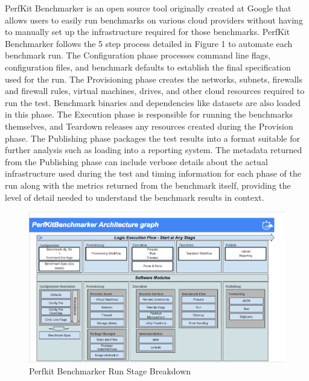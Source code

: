 

PerfKit Benchmarker is an open source tool originally created at Google that allows users to easily run benchmarks on various cloud providers without having to manually set up the infrastructure required for those benchmarks. PerfKit Benchmarker follows the 5 step process detailed in Figure 1 to automate each benchmark run. The Configuration phase processes command line flags, configuration files, and benchmark defaults to establish the final specification used for the run. The Provisioning phase creates the networks, subnets, firewalls and firewall rules, virtual machines, drives, and other cloud resources required to run the test. Benchmark binaries and dependencies like datasets are also loaded in this phase. The Execution phase is responsible for running the benchmarks themselves,  and Teardown releases any resources created during the Provision phase. The Publishing phase packages the test results into a format suitable for further analysis such as  loading into a reporting system. The metadata returned from the Publishing phase can include verbose details about the actual infrastructure used during the test and timing information for each phase of the run along with the metrics returned from the benchmark itself, providing the level of detail needed to understand the benchmark results in context.


\begin{figure}[ht]
\centering
\includegraphics[width=.75\textwidth]{resource/img/ch_benchmarking/pkb_arch.png}
\caption{Perfkit Benchmarker Run Stage Breakdown}
\label{fig:benchmarking:pkb_arch}
\end{figure} 
